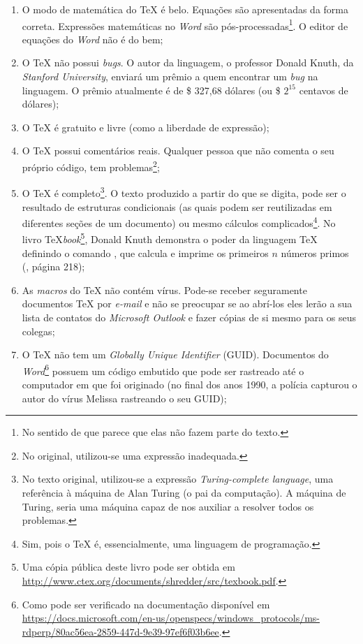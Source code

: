 \begingroup
\renewcommand{\labelenumi}{\arabic{enumi}.}
\begin{enumerate}
    \item O modo de matemática do \TeX{} é belo. Equações são apresentadas da forma correta. Expressões matemáticas no \textit{Word} são pós-processadas\footnote{No sentido de que parece que elas não fazem parte do texto.}. O editor de equações do \textit{Word} não é do bem;
    \item O \TeX{} não possui \textit{bugs}. O autor da linguagem, o professor Donald Knuth, da \textit{Stanford University}, enviará um prêmio a quem encontrar um \textit{bug} na linguagem. O prêmio atualmente é de \$ 327,68 dólares (ou \$ $2^{15}$ centavos de dólares);
    \item O \TeX{} é gratuito e livre (como a liberdade de expressão);
    \item O \TeX{} possui comentários reais. Qualquer pessoa que não comenta o seu próprio código, tem problemas\footnote{No original, utilizou-se uma expressão inadequada.};
    \item O \TeX{} é completo\footnote{No texto original, utilizou-se a expressão \textit{Turing-complete language}, uma referência à máquina de Alan Turing (o pai da computação). A máquina de Turing, seria uma máquina capaz de nos auxiliar a resolver todos os problemas.}. O texto produzido a partir do que se digita, pode ser o resultado de estruturas condicionais (as quais podem ser reutilizadas em diferentes seções de um documento) ou mesmo cálculos complicados\footnote{Sim, pois o \TeX{} é, essencialmente, uma linguagem de programação.}. No livro \TeX \textit{book}\footnote{Uma cópia pública deste livro pode ser obtida em \url{http://www.ctex.org/documents/shredder/src/texbook.pdf}.}, Donald Knuth demonstra o poder da linguagem \TeX{} definindo o comando \texttt{}, que calcula e imprime os primeiros $n$ números primos (, página 218);
    \item As \textit{macros} do \TeX{} não contém vírus. Pode-se receber seguramente documentos \TeX{} por \textit{e-mail} e não se preocupar se ao abrí-los eles lerão a sua lista de contatos do \textit{Microsoft Outlook} e fazer cópias de si mesmo para os seus colegas;
    \item O \TeX{} não tem um \textit{Globally Unique Identifier} (GUID). Documentos do \textit{Word}\footnote{Como pode ser verificado na documentação disponível em \url{https://docs.microsoft.com/en-us/openspecs/windows_protocols/ms-rdperp/80ac56ea-2859-447d-9e39-97ef6f03b6ee}.} possuem um código embutido que pode ser rastreado até o computador em que foi originado (no final dos anos 1990, a polícia capturou o autor do vírus Melissa rastreando o seu GUID);

\end{enumerate}
